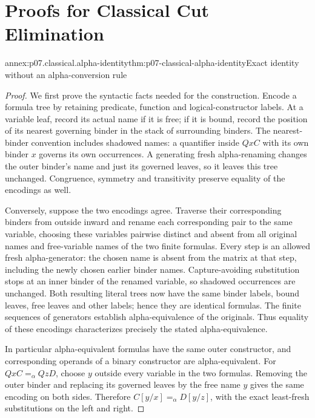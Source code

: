 \chapter{Proofs for Classical Cut Elimination}
\label{annex:p07-classical-cut-elimination}

\begin{annexitem}{annex:p07.classical.alpha-identity}{thm:p07-classical-alpha-identity}{Exact identity without an alpha-conversion rule}
\begin{proof}
We first prove the syntactic facts needed for the construction. Encode a
formula tree by retaining predicate, function and logical-constructor
labels. At a variable leaf, record its actual name if it is free; if it
is bound, record the position of its nearest governing binder in the
stack of surrounding binders. The nearest-binder convention includes
shadowed names: a quantifier inside \(QxC\) with its own binder \(x\)
governs its own occurrences. A generating fresh alpha-renaming changes
the outer binder's name and just its governed leaves, so it leaves this
tree unchanged. Congruence, symmetry and transitivity preserve equality
of the encodings as well.

Conversely, suppose the two encodings agree. Traverse their corresponding
binders from outside inward and rename each corresponding pair to the same
variable, choosing these variables pairwise distinct and absent from all
original names and free-variable names of the two finite formulas. Every
step is an allowed fresh alpha-generator: the chosen name is absent from
the matrix at that step, including the newly chosen earlier binder names.
Capture-avoiding substitution stops at an inner binder of the renamed
variable, so shadowed occurrences are unchanged. Both resulting literal
trees now have the same binder labels, bound leaves, free leaves and other
labels; hence they are identical formulas. The finite sequences of
generators establish alpha-equivalence of the originals. Thus equality of
these encodings characterizes precisely the stated alpha-equivalence.

In particular alpha-equivalent formulas have the same outer constructor,
and corresponding operands of a binary constructor are alpha-equivalent.
For \(QxC=_{\alpha}QzD\), choose \(y\) outside every variable in the
two formulas. Removing the outer binder and replacing its governed leaves
by the free name \(y\) gives the same encoding on both sides. Therefore
\(C[y/x]=_{\alpha}D[y/z]\), with the exact least-fresh substitutions
on the left and right.


\end{proof}
\end{annexitem}

